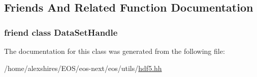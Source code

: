 \subsection{Friends And Related Function Documentation}
\hypertarget{classeos_1_1hdf5_1_1AttributeHandle_ab1c111c97e6fd99718c0c5f172cf76bc}{
\subsubsection[{DataSetHandle}]{\setlength{\rightskip}{0pt plus 5cm}friend class {\bf DataSetHandle}}}
\label{classeos_1_1hdf5_1_1AttributeHandle_ab1c111c97e6fd99718c0c5f172cf76bc}


The documentation for this class was generated from the following file:\begin{DoxyCompactItemize}
\item 
/home/alexshires/EOS/eos-\/next/eos/utils/\hyperlink{hdf5_8hh}{hdf5.hh}\end{DoxyCompactItemize}

